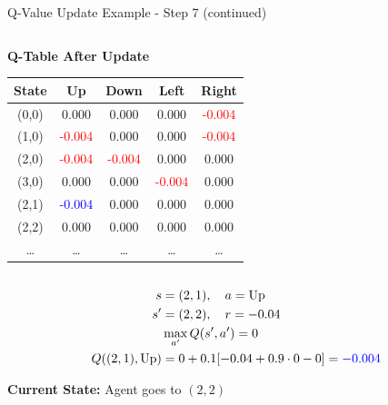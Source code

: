 \documentclass[aspectratio=169]{beamer}
\begin{document}
\begin{frame}{Q-Value Update Example - Step 7 (continued)}
\begin{columns}
\begin{column}{0.5\textwidth}
             \textbf{Q-Table After Update}
            \small
            \begin{table}[h]
                \centering
                \begin{tabular}{|c|c|c|c|c|}
                    \hline
                    \textbf{State} & \textbf{Up} & \textbf{Down} & \textbf{Left} & \textbf{Right} \\
                    \hline
                    (0,0) & 0.000 & 0.000 & 0.000 & \textcolor{red}{-0.004} \\
                    (1,0) & \textcolor{red}{-0.004} & 0.000 & 0.000 & \textcolor{red}{-0.004} \\
                    (2,0) & \textcolor{red}{-0.004} & \textcolor{red}{-0.004} & 0.000 & 0.000 \\
                    (3,0) & 0.000 & 0.000 & \textcolor{red}{-0.004} & 0.000 \\
                    (2,1) & \textcolor{blue}{-0.004} & 0.000 & 0.000 & 0.000 \\
                    (2,2) & 0.000 & 0.000 & 0.000 & 0.000 \\
                    \dots & \dots & \dots & \dots & \dots \\
                    \hline
                \end{tabular}
            \end{table}

            
        \end{column}
    \end{columns}

    \vspace{-5mm}
    \begin{align}
                s &= (2,1), \quad a = \text{Up} \\
                s' &= (2,2), \quad r = -0.04 \\
                & \max_{a'}Q(s',a') = 0 \\
                Q((2,1),\text{Up}) &= 0 + 0.1[-0.04 + 0.9 \cdot 0 - 0] = \textcolor{blue}{-0.004}
            \end{align}
            
            
            \textbf{Current State:} Agent goes to $(2,2)$
\end{frame}
\end{document}
